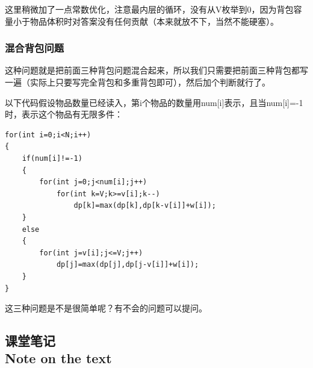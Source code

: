 \documentclass{article}
\theoremstyle{nonumberplain}
\newcommand{\note}{\ \par
	\subsection*{课堂笔记\\\tiny{Note on the text}}
	\newpage}
\begin{document}
这里稍微加了一点常数优化，注意最内层的循环，没有从V枚举到0，因为背包容量小于物品体积时对答案没有任何贡献（本来就放不下，当然不能硬塞）。

\subsubsection{混合背包问题}
这种问题就是把前面三种背包问题混合起来，所以我们只需要把前面三种背包都写一遍（实际上只要写完全背包和多重背包即可），然后加个判断就行了。

以下代码假设物品数量已经读入，第i个物品的数量用num[i]表示，且当num[i]=-1时，表示这个物品有无限多件：
\begin{verbatim}
for(int i=0;i<N;i++)
{
    if(num[i]!=-1)
    {
        for(int j=0;j<num[i];j++)
            for(int k=V;k>=v[i];k--) 
                dp[k]=max(dp[k],dp[k-v[i]]+w[i]);
	}
    else
    {
        for(int j=v[i];j<=V;j++)
            dp[j]=max(dp[j],dp[j-v[i]]+w[i]);
    }
}
\end{verbatim}

这三种问题是不是很简单呢？有不会的问题可以提问。
\note
\end{document}
